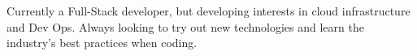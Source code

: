 

\begin{cvparagraph}

Currently a Full-Stack developer, but developing interests in cloud infrastructure and Dev Ops. Always looking to try out new technologies and learn the industry's best practices when coding.
\end{cvparagraph}
